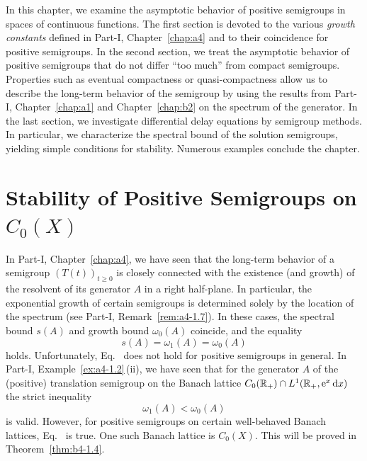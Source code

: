 \setcounter{section}{0}
\label{chap:b4}
\thispagestyle{empty}
In this chapter, we examine the asymptotic behavior%
of positive semigroups in spaces of continuous functions.
The first section is devoted to the various \emph{growth constants} defined in Part-I, Chapter~\ref{chap:a4} and to their coincidence for positive semigroups.
In the second section, we treat the asymptotic behavior of positive semigroups that do not differ \enquote{too much} from compact semigroups.
Properties such as eventual compactness or quasi-compactness allow us to describe the long-term behavior of the semigroup by using the results from Part-I, Chapter~\ref{chap:a1} and Chapter~\ref{chap:b2} on the spectrum of the generator.
In the last section, we investigate differential delay equations by semigroup methods. 
In particular, we characterize the spectral bound of the solution semigroups, yielding simple conditions for stability. 
Numerous examples conclude the chapter.
\section{Stability of Positive Semigroups on \texorpdfstring{$C_{0}(X)$}{C_{0}(X)}}\label{sec:b4-1}%
\hspace{1cm}{\Large by Frank Neubrander}
\vspace{.5cm}
\newline
In Part-I, Chapter~\ref{chap:a4}, we have seen that the long-term behavior of a semigroup $(T(t))_{t \geq 0}$ is closely connected with the existence (and growth) of the resolvent of its generator $A$ in a right half-plane.
In particular, the exponential growth of certain semigroups is determined solely by the location of the spectrum (see Part-I, Remark~\ref{rem:a4-1.7}).
In these cases, the spectral bound%
$s(A)$ and growth bound%
$\omega_{0}(A)$ coincide, and the equality
\begin{equation}\label{eq:b4-1.1}
   s(A) = \omega_1(A) = \omega_{0}(A)
\end{equation}
holds.
Unfortunately, Eq.~ does not hold for positive semigroups in general.
In Part-I, Example~\ref{ex:a4-1.2}\,(ii), we have seen that for the generator $A$ of the (positive) translation semigroup on the Banach lattice $C_{0}(\mathbb{R}_+) \cap L^1(\mathbb{R}_+,\mathrm{e}^x \mathop{}\!\mathrm{d}{x})$ the strict inequality 
\[
\omega_1(A) < \omega_{0}(A)
\]
is valid.
However, for positive semigroups on certain well-behaved Banach lattices, Eq.~ is true.
One such Banach lattice is $C_{0}(X)$. 
This will be proved in Theorem~\ref{thm:b4-1.4}.

